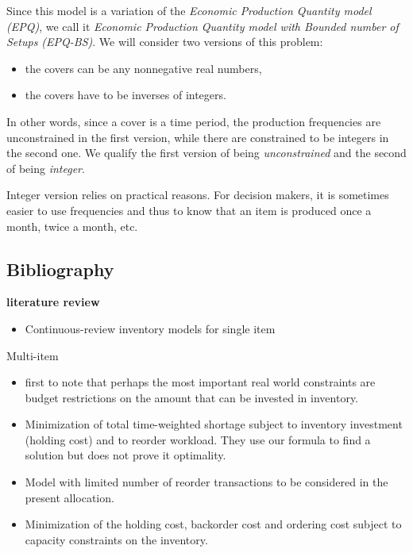 Since this model is a variation of the \emph{Economic Production Quantity model (EPQ)}, we call it \emph{Economic Production Quantity model with Bounded number of Setups (EPQ-BS)}.
We will consider two versions of this problem:
\begin{itemize}
  \item the covers can be any nonnegative real numbers,
  \item the covers have to be inverses of integers.
\end{itemize}
In other words, since a cover is a time period, the production frequencies are unconstrained in the first version, while there are constrained to be integers in the second one.
We qualify the first version of being {\em unconstrained} and the second of being {\em integer}.


Integer version relies on practical reasons.
For decision makers, it is sometimes easier to use frequencies and thus to know that an item is produced once a month, twice a month, etc.



\subsection{Bibliography}

\textbf{literature review}

\begin{itemize}
   \item \cite{Gayon2016} Continuous-review inventory models for single item
\end{itemize} 

Multi-item

\begin{itemize}
  \item \cite{Hadley1963} first to note that perhaps the most important real world constraints are budget restrictions on the amount that can be invested in inventory.
  \item \cite{Schrady1971} Minimization of total time-weighted shortage subject to inventory investment (holding cost) and to reorder workload.
  They use our formula to find a solution but does not prove it optimality.
  \item \cite{Daeschner1975} Model with limited number of reorder transactions to be considered in the present allocation.
  \item \cite{Ohno2001} Minimization of the holding cost, backorder cost and ordering cost subject to capacity constraints on the inventory.
\end{itemize}


